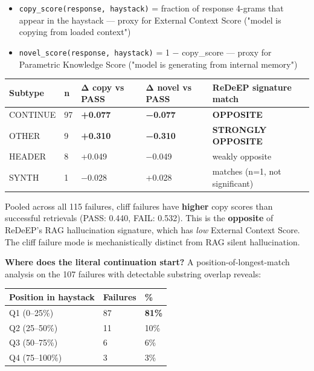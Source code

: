 \documentclass[11pt]{article}
\begin{document}
\begin{itemize}
\item \texttt{copy\_score(response, haystack)} = fraction of response 4-grams that appear in the haystack — proxy for External Context Score ("model is copying from loaded context")
\item \texttt{novel\_score(response, haystack)} = 1 − copy\_score — proxy for Parametric Knowledge Score ("model is generating from internal memory")
\end{itemize}


\begin{center}
\begin{tabular}{lllll}
\toprule
Subtype & n & Δ copy vs PASS & Δ novel vs PASS & ReDeEP signature match \\
\midrule
CONTINUE & 97 & \textbf{+0.077} & \textbf{−0.077} & \textbf{OPPOSITE} \\
OTHER & 9 & \textbf{+0.310} & \textbf{−0.310} & \textbf{STRONGLY OPPOSITE} \\
HEADER & 8 & +0.049 & −0.049 & weakly opposite \\
SYNTH & 1 & −0.028 & +0.028 & matches (n=1, not significant) \\
\bottomrule
\end{tabular}
\end{center}


Pooled across all 115 failures, cliff failures have \textbf{higher} copy scores than successful retrievals (PASS: 0.440, FAIL: 0.532). This is the \textbf{opposite} of ReDeEP's RAG hallucination signature, which has \textit{low} External Context Score. The cliff failure mode is mechanistically distinct from RAG silent hallucination.


\textbf{Where does the literal continuation start?} A position-of-longest-match analysis on the 107 failures with detectable substring overlap reveals:


\begin{center}
\begin{tabular}{lll}
\toprule
Position in haystack & Failures & \% \\
\midrule
Q1 (0–25\%) & 87 & \textbf{81\%} \\
Q2 (25–50\%) & 11 & 10\% \\
Q3 (50–75\%) & 6 & 6\% \\
Q4 (75–100\%) & 3 & 3\% \\
\bottomrule
\end{tabular}
\end{center}
\end{document}
